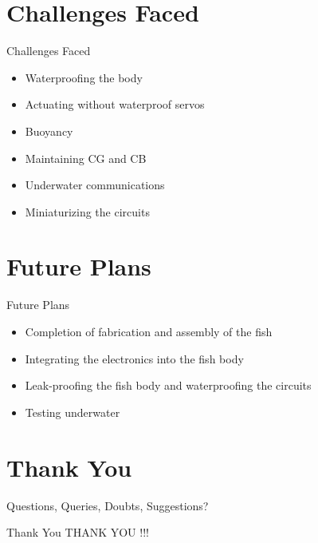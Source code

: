 \documentclass[10pt, a4paper]{beamer}
\begin{document}
\section{Challenges Faced}
\begin{frame}{Challenges Faced}
	\begin{itemize}
    \setlength\itemsep{1em}
		\item Waterproofing the body
        \item Actuating without waterproof servos
        \item Buoyancy
        \item Maintaining CG and CB 
        \item Underwater communications
        \item Miniaturizing the circuits
	\end{itemize}
\end{frame}

\section{Future Plans}
\begin{frame}{Future Plans}
	\begin{itemize}
    \setlength\itemsep{1em}
        \item Completion of fabrication and assembly of the fish
        \item Integrating the electronics into the fish body
        \item Leak-proofing the fish body and waterproofing the circuits
        \item Testing underwater
	\end{itemize}
\end{frame}

\section{Thank You}
\begin{frame}
	\centering Questions, Queries, Doubts, Suggestions?
\end{frame}

\begin{frame}{Thank You}
	\centering THANK YOU !!!\\
\end{frame}
\end{document}
